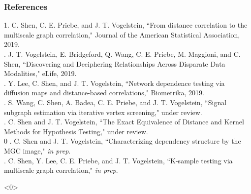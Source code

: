 \documentclass[mathserif,t]{beamer}
\newcommand{\blind}{0}
\begin{document}
%
%

\begin{frame}%
\frametitle{References}
\small

1. \textcolor{UniOrange}{C. Shen}, C. E. Priebe, and J. T. Vogelstein, ``From distance correlation to the
multiscale graph correlation," Journal of the American Statistical Association, 2019.\\
. J. T. Vogelstein, E. Bridgeford, Q. Wang, C. E. Priebe, M. Maggioni, and \textcolor{UniOrange}{C. Shen},
``Discovering and Deciphering Relationships Across Disparate Data Modalities," eLife, 2019.\\
. Y. Lee, \textcolor{UniOrange}{C. Shen}, and J. T. Vogelstein, ``Network dependence testing via diffusion
maps and distance-based correlations," Biometrika, 2019.\\
. S. Wang, \textcolor{UniOrange}{C. Shen}, A. Badea, C. E. Priebe, and J. T. Vogelstein, ``Signal
subgraph estimation via iterative vertex screening," under review.\\
. \textcolor{UniOrange}{C. Shen} and J. T. Vogelstein, ``The Exact Equivalence of Distance and Kernel Methods for Hypothesis Testing," under review.\\
\blind
{
. \textcolor{UniOrange}{C. Shen} and J. T. Vogelstein, ``Characterizing dependency structure by the MGC image," \textit{in prep}.\\
. \textcolor{UniOrange}{C. Shen}, Y. Lee, C. E. Priebe, and J. T. Vogelstein, ``K-sample testing via
multiscale graph correlation," \textit{in prep}.
}\fi
%
%
\end{frame}

\addtocounter{framenumber}{-1} 
\begin{frame}<0> 

\end{frame} 
%

\end{document}
